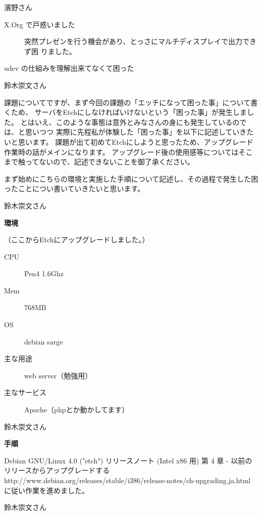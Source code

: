 \documentclass[cjk,dvipdfmx,12pt]{beamer}
\begin{document}
\begin{frame}{濱野さん}
\begin{description}
 \item[X.Org で戸惑いました]
 突然プレゼンを行う機会があり、とっさにマルチディスプレイで出力できず困
 りました。

 \item[udev の仕組みを理解出来てなくて困った]

\end{description}

\end{frame}\begin{frame}{鈴木崇文さん}


課題についてですが、まず今回の課題の「エッチになって困った事」について書くため、
サーバをEtchにしなければいけないという「困った事」が発生しました。
とはいえ、このような事態は意外とみなさんの身にも発生しているのでは、と思いつつ
実際に先程私が体験した「困った事」を以下に記述していきたいと思います。
課題が出て初めてEtchにしようと思ったため、アップグレード作業時の話がメインになります。
アップグレード後の使用感等についてはそこまで触ってないので、記述できないことを御了承ください。

まず始めにこちらの環境と実施した手順について記述し、その過程で発生した困ったことについ書いていきたいと思います。


\end{frame}\begin{frame}{鈴木崇文さん}

\textbf{環境}

（ここからEtchにアップグレードしました。）
\begin{description}
 \item 	 [CPU]Pen4 1.6Ghz
 \item	 [Mem]768MB
 \item	 [OS]debian sarge
 \item	 [主な用途]web server（勉強用）
 \item	 [主なサービス]Apache（phpとか動かしてます）
\end{description}

\end{frame}\begin{frame}{鈴木崇文さん}

\textbf{手順}

	Debian GNU/Linux 4.0 ("etch") リリースノート (Intel x86 用)
	第 4 章 - 以前のリリースからアップグレードする
	http://www.debian.org/releases/stable/i386/release-notes/ch-upgrading.ja.html
	に従い作業を進めました。

\end{frame}\begin{frame}{鈴木崇文さん}


\end{frame}
\end{document}
